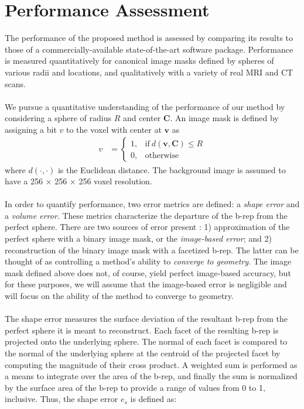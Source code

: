 \section{Performance Assessment}
%

The performance of the proposed method is assessed by comparing its results to those of a commercially-available state-of-the-art software package. Performance is measured quantitatively for canonical image masks defined by spheres of various radii and locations, and qualitatively with a variety of real MRI and CT scans. \\ \\
%
We pursue a quantitative understanding of the performance of our method by considering a sphere of radius $R$ and center $\bm{C}$.  An image mask is defined by assigning a bit $v$ to the voxel with center at $\bm{v}$ as
\begin{align} 
	v &=  \begin{cases}
		1, & \text{if}\ d \left(\bm{v},\bm{C}\right) \le R \\
		0, & \text{otherwise}
	\end{cases}
\end{align}
where $d(\cdot,\cdot)$ is the Euclidean distance. The background image is assumed to have a 256 $\times$ 256 $\times$ 256 voxel resolution. \\ \\
%
In order to quantify performance, two error metrics are defined: a {\em shape error} and a {\em volume error}. These metrics characterize the departure of the b-rep from the perfect sphere.  There are two sources of error present \cite{young_2008}: 1) approximation of the perfect sphere with a binary image mask, or the {\em image-based error}; and 2) reconstruction of the binary image mask with a facetized b-rep.  The latter can be thought of as controlling a method's ability to {\em converge to geometry}. The image mask defined above does not, of course, yield perfect image-based accuracy, but for these purposes, we will assume that the image-based error is negligible and will focus on the ability of the method to converge to geometry.\\ \\
%
The shape error measures the surface deviation of the resultant b-rep from the perfect sphere it is meant to reconstruct. Each facet of the resulting b-rep is projected onto the underlying sphere. The normal of each facet is compared to the normal of the underlying sphere at the centroid of the projected facet by computing the magnitude of their cross product. A weighted sum is performed as a means to integrate over the area of the b-rep, and finally the sum is normalized by the surface area of the b-rep to provide a range of values from 0 to 1, inclusive. Thus, the shape error $e_s$ is defined as:
